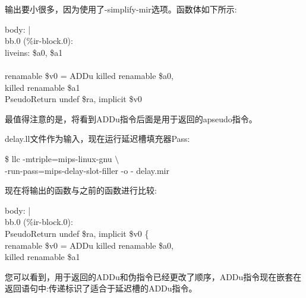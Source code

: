 输出要小很多，因为使用了-simplify-mir选项。函数体如下所示:\par

\begin{tcolorbox}[colback=white,colframe=black]
body: \hspace{3cm} | \\
\hspace*{0.5cm}bb.0 (\%ir-block.0): \\
\hspace*{1cm}liveins: \$a0, \$a1 \\
\\
\hspace*{1cm}renamable \$v0 = ADDu killed renamable \$a0, \\
\hspace*{6cm}killed renamable \$a1 \\
\hspace*{1cm}PseudoReturn undef \$ra, implicit \$v0
\end{tcolorbox}

最值得注意的是，将看到ADDu指令后面是用于返回的apseudo指令。\par

delay.ll文件作为输入，现在运行延迟槽填充器Pass:\par

\begin{tcolorbox}[colback=white,colframe=black]
\$ llc -mtriple=mips-linux-gnu $\setminus$ \\
\hspace*{2cm}-run-pass=mips-delay-slot-filler -o - delay.mir
\end{tcolorbox}

现在将输出的函数与之前的函数进行比较:\par

\begin{tcolorbox}[colback=white,colframe=black]
body: \hspace{3cm} | \\
\hspace*{0.5cm}bb.0 (\%ir-block.0): \\
\hspace*{1cm}PseudoReturn undef \$ra, implicit \$v0 \{ \\
\hspace*{1.5cm}renamable \$v0 = ADDu killed renamable \$a0, \\
\hspace*{6cm}killed renamable \$a1
\end{tcolorbox}

您可以看到，用于返回的ADDu和伪指令已经更改了顺序，ADDu指令现在嵌套在返回语句中:传递标识了适合于延迟槽的ADDu指令。\par

